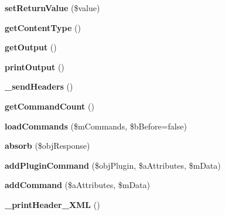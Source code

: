 \begin{DoxyCompactItemize}
\item 
\hypertarget{classxajaxResponse_af206a07e9d823aa57975c113ac05808b}{
{\bfseries setReturnValue} (\$value)}
\label{classxajaxResponse_af206a07e9d823aa57975c113ac05808b}

\item 
\hypertarget{classxajaxResponse_a36049656323cafbe261c73aa2c280d1e}{
{\bfseries getContentType} ()}
\label{classxajaxResponse_a36049656323cafbe261c73aa2c280d1e}

\item 
\hypertarget{classxajaxResponse_ad4b42cdc20ae6c97c3141082d62b2e8f}{
{\bfseries getOutput} ()}
\label{classxajaxResponse_ad4b42cdc20ae6c97c3141082d62b2e8f}

\item 
\hypertarget{classxajaxResponse_af47cd7b9bcc2ac95c0dec68496de9f5c}{
{\bfseries printOutput} ()}
\label{classxajaxResponse_af47cd7b9bcc2ac95c0dec68496de9f5c}

\item 
\hypertarget{classxajaxResponse_a0e84d6ab04280a7f15944ee18a0b6c7a}{
{\bfseries \_\-sendHeaders} ()}
\label{classxajaxResponse_a0e84d6ab04280a7f15944ee18a0b6c7a}

\item 
\hypertarget{classxajaxResponse_ad753ea8723e3990d132d4ae634593c08}{
{\bfseries getCommandCount} ()}
\label{classxajaxResponse_ad753ea8723e3990d132d4ae634593c08}

\item 
\hypertarget{classxajaxResponse_a2c9b1f398a215fed5414e1c36b0e2ee2}{
{\bfseries loadCommands} (\$mCommands, \$bBefore=false)}
\label{classxajaxResponse_a2c9b1f398a215fed5414e1c36b0e2ee2}

\item 
\hypertarget{classxajaxResponse_a01bef1368abbd52b973224ff6c9bb42a}{
{\bfseries absorb} (\$objResponse)}
\label{classxajaxResponse_a01bef1368abbd52b973224ff6c9bb42a}

\item 
\hypertarget{classxajaxResponse_ab0baff7dbc24c132abfefff35b0ddf2b}{
{\bfseries addPluginCommand} (\$objPlugin, \$aAttributes, \$mData)}
\label{classxajaxResponse_ab0baff7dbc24c132abfefff35b0ddf2b}

\item 
\hypertarget{classxajaxResponse_af0fc2e15521ef60e481dbc7724b907e3}{
{\bfseries addCommand} (\$aAttributes, \$mData)}
\label{classxajaxResponse_af0fc2e15521ef60e481dbc7724b907e3}

\item 
\hypertarget{classxajaxResponse_a175123addfaccded7c3ab397f0862d57}{
{\bfseries \_\-printHeader\_\-XML} ()}
\label{classxajaxResponse_a175123addfaccded7c3ab397f0862d57}


\end{DoxyCompactItemize}
